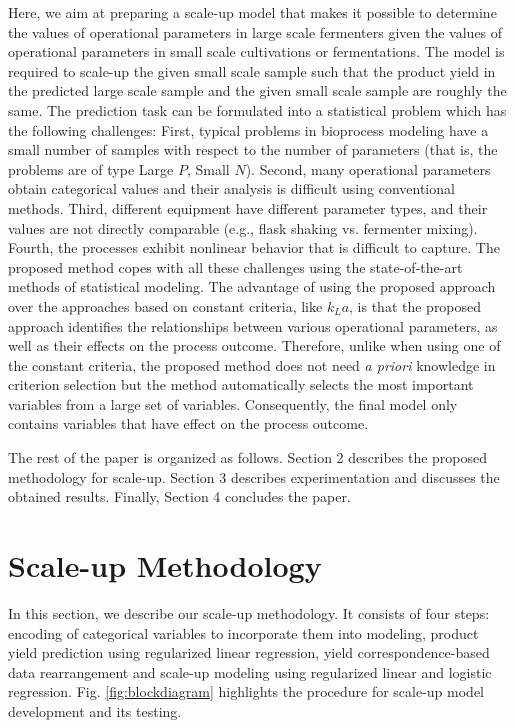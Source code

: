\documentclass{article}
\begin{document}
Here, we aim at preparing a scale-up model that makes it possible to determine the values of operational parameters in large scale fermenters given the values of operational parameters in small scale cultivations or fermentations. The model is required to scale-up the given small scale sample such that the product yield in the predicted large scale sample and the given small scale sample are roughly the same. The prediction task can be formulated into a statistical problem which has the following challenges: First, typical problems in bioprocess modeling have a small number of samples with respect to the number of parameters (that is, the problems are of type Large $P$, Small $N$). Second, many operational parameters obtain categorical values and their analysis is difficult using conventional methods. Third, different equipment have different parameter types, and their values are not directly comparable (e.g., flask shaking vs. fermenter mixing). Fourth, the processes exhibit nonlinear behavior that is difficult to capture. The proposed method copes with all these challenges using the state-of-the-art methods of statistical modeling. The advantage of using the proposed approach over the approaches based on constant criteria, like ${k_{L}a}$, is that the proposed approach identifies the relationships between various operational parameters, as well as their effects on the process outcome. Therefore, unlike when using one of the constant criteria, the proposed method does not need \textit{a priori} knowledge in criterion selection but the method automatically selects the most important variables from a large set of variables. Consequently, the final model only contains variables that have effect on the process outcome. 

The rest of the paper is organized as follows. Section 2 describes the proposed methodology for scale-up. Section 3 describes experimentation and discusses the obtained results. Finally, Section 4 concludes the paper.


\section{Scale-up Methodology}
\label{sec:methodology}

In this section, we describe our scale-up methodology. It consists of four steps: encoding of categorical variables to incorporate them into modeling, product yield prediction using regularized linear regression, yield correspondence-based data rearrangement and scale-up modeling using regularized linear and logistic regression. Fig. \ref{fig:blockdiagram} highlights the %
procedure for scale-up model development and its testing.
\end{document}
